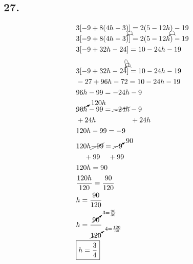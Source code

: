 \documentclass{article}
\newcommand{\tikzmark}[1]{\tikz[overlay,remember picture] \node (#1) {};}
\newcommand{\DrawBox}[2]{%
    \begin{tikzpicture}[overlay,remember picture]
        \draw[->,shorten >=5pt,shorten <=5pt,out=70,in=130,distance=0.5cm,#1] (MarkA.north) to (MarkC.north);
        \draw[->,shorten >=5pt,shorten <=5pt,out=50,in=140,distance=0.3cm,#2] (MarkA.north) to (MarkB.north);
    \end{tikzpicture}
}
\newcommand{\DrawBoxThree}[3]{%
    \begin{tikzpicture}[overlay,remember picture]
        \draw[->,shorten >=5pt,shorten <=5pt,out=70,in=130,distance=0.5cm,#1] (MarkA.north) to (MarkC.north);
        \draw[->,shorten >=5pt,shorten <=5pt,out=50,in=140,distance=0.3cm,#2] (MarkA.north) to (MarkB.north);
        \draw[->,shorten >=5pt,shorten <=5pt,out=90,in=120,distance=0.7cm,#3] (MarkA.north) to (MarkD.north);
    \end{tikzpicture}
}
\begin{document}
    \subsection*{27.}
    \begin{align*}
        & 3[-9 + 8(4h - 3)] = 2(5 - 12h) - 19 \\
        & 3[-9 + 8\tikzmark{MarkA} (4h\tikzmark{MarkB} - 3\tikzmark{MarkC})]\DrawBox{black}{black} = \tikzmark{MarkA}2 (5\tikzmark{MarkB} - 12h\tikzmark{MarkC})\DrawBox{black}{black} - 19\\
        & 3[-9 + 32h - 24] = 10 - 24h - 19\\
        & \\
        & \tikzmark{MarkA}3[-9\tikzmark{MarkB} + 32h\tikzmark{MarkC} -24\tikzmark{MarkD}]\DrawBoxThree{black}{black}{black}  = 10 -24h -19\\
        & -27  + 96h - 72 = 10 - 24h -19\\
        & 96h -99  = - 24h - 9\\
        & \cancelto{120h}{96h} - 99 = \cancel{-24h} - 9 \\
        & +24h \hspace{1.7cm} +24h \\
        & 120h - 99 = -9 \\
        & 120h \cancel{- 99} = \cancelto{90}{-9}\\
        & \hspace{.4cm} + 99 \hspace{.4cm} + 99 \\
        & 120h = 90 \\
        & \frac{120h}{120} = \frac{90}{120} \\
        & h = \frac{90}{120} \\
        & h = \frac{\cancelto{3 = \frac{90}{30}}{90}}{\cancelto{4 = \frac{120}{30}}{120}} \\
        & \boxed{h = \frac{3}{4}}
    \end{align*}
\end{document}
